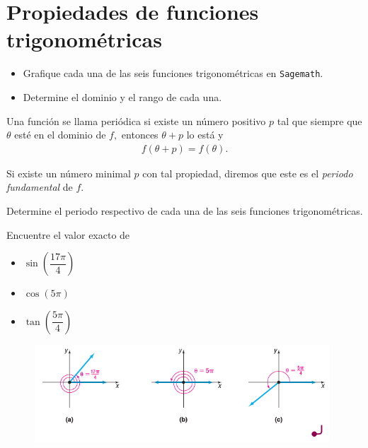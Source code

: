 
\section{Propiedades de funciones trigonométricas}

{}
	\begin{problema}
		\begin{itemize}
			\item Grafique cada una de las seis funciones trigonométricas en \texttt{Sagemath}.
			\item Determine el dominio y el rango de cada una.
		\end{itemize}  
	\end{problema}
	

{}
	\begin{definicion}
		Una función se llama periódica si existe un número positivo $p$ tal que siempre que $\theta$ esté en el dominio de $f,$ entonces $\theta+p$ lo está y 
		\begin{align*}
			f(\theta+p)=f(\theta).
		\end{align*}
		
		Si existe un número minimal $p$ con tal propiedad, diremos que este es el \emph{periodo fundamental} de $f.$
	\end{definicion}

{}
	\begin{problema}
		Determine el periodo respectivo de cada una de las seis funciones trigonométricas.
	\end{problema}
	


	\begin{problema}
		\label{exmp:6301}
		Encuentre el valor exacto de 
		\begin{itemize}
			\item $\sin\left( \dfrac{17\pi}{4} \right)$
			\item $\cos\left( 5\pi \right)$
			\item $\tan\left( \dfrac{5\pi}{4} \right)$
		\end{itemize}
		
	\end{problema}

{}
	\begin{figure}
		\centering
		\includegraphics[width=11cm,keepaspectratio=true]{./trig/sull0628.png}
		\label{fig:0638}
	\end{figure}
	

